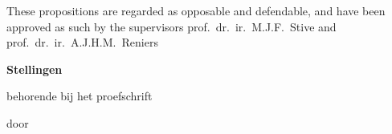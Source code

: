 \documentclass{dissertation}
\begin{document}
\bigskip
\bigskip

\begin{center}
These propositions are regarded as opposable and defendable, and have been approved as such by the supervisors prof.\ dr.\ ir.\ M.J.F.\ Stive and prof.\ dr.\ ir.\ A.J.H.M.\ Reniers
\end{center}

\clearpage
{

\begin{center}

{\Large\titlefont\bfseries Stellingen}

\bigskip

behorende bij het proefschrift

\bigskip

{\makeatletter
\titlestyle\bfseries\large\@title
\makeatother}

{\makeatletter
\ifx\@subtitle\undefined\else
    \titlefont\titleshape\@subtitle
\fi
\makeatother}

\bigskip

door

\bigskip

\makeatletter
{\large\titlefont\bfseries\@firstname\ {\titleshape\@lastname}}
\makeatother

\end{center}

\bigskip
\bigskip

\begin{enumerate}


\end{enumerate}}
\end{document}
